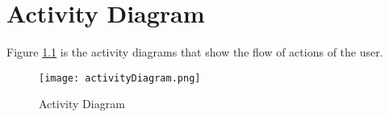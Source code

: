 \chapter{Activity Diagram}
Figure \ref{fig:activityDiagram} is the activity diagrams that show the flow of actions of the user.
\begin{figure}
	\label{fig:activityDiagram}
	\centering
    \texttt{[image: activityDiagram.png]}
    
    \caption{Activity Diagram}
\end{figure}